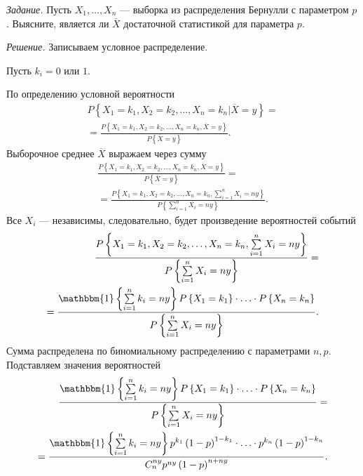 \textit{Задание.} Пусть $X_1, \dotsc, X_n$ --- выборка из распределения Бернулли с параметром $p$.
Выясните, является ли $ \overline{X}$ достаточной статистикой для параметра $p$.

\textit{Решение.} Записываем условное распределение.

Пусть $k_i = 0$ или $1$.

По определению условной вероятности
\begin{equation*}
  \begin{split}
    P \left\{ \left. X_1 = k_1, X_2 = k_2, \dotsc, X_n = k_n \right| \overline{X} = y \right\} = \\
    = \frac{P \left\{ X_1 = k_1, X_2 = k_2, \dotsc, X_n = k_n, \overline{X} = y \right\} }{P \left\{ \overline{X} = y \right\} }.
  \end{split}
\end{equation*}
Выборочное среднее $ \overline{X}$ выражаем через сумму
\begin{equation*}
  \begin{split}
    \frac{P \left\{ X_1 = k_1, X_2 = k_2, \dotsc, X_n = k_n, \overline{X} = y \right\} }{P \left\{ \overline{X} = y \right\} } = \\
    = \frac{P \left\{ X_1 = k_1, X_2 = k_2, \dotsc, X_n = k_n, \sum \limits_{i = 1}^n X_i = ny \right\} }{P \left\{ \sum \limits_{i = 1}^n X_i = ny \right\} }.
  \end{split}
\end{equation*}
Все $X_i$ --- независимы, следовательно, будет произведение вероятностей событий
\begin{equation*}
  \begin{split}
    \frac{P \left\{ X_1 = k_1, X_2 = k_2, \dotsc, X_n = k_n, \sum \limits_{i = 1}^n X_i = ny \right\} }{P \left\{ \sum \limits_{i = 1}^n X_i = ny \right\} } = \\
    = \frac{ \mathbbm{1} \left\{ \sum \limits_{i = 1}^n k_i = ny \right\} P \left\{ X_1 = k_1 \right\} \cdot \dotsc \cdot P \left\{ X_n = k_n \right\} }{P \left\{ \sum \limits_{i = 1}^n X_i = ny \right\} }.
  \end{split}
\end{equation*}
Сумма распределена по биномиальному распределению с параметрами $n, p$.
Подставляем значения вероятностей
\begin{equation*}
  \begin{split}
    \frac{ \mathbbm{1} \left\{ \sum \limits_{i = 1}^n k_i = ny \right\} P \left\{ X_1 = k_1 \right\} \cdot \dotsc \cdot P \left\{ X_n = k_n \right\} }{P \left\{ \sum \limits_{i = 1}^n X_i = ny \right\} } = \\
    = \frac{ \mathbbm{1} \left\{ \sum \limits_{i = 1}^n k_i = ny \right\} p^{k_1} \left( 1 - p \right)^{1 - k_1} \cdot \dotsc \cdot p^{k_n} \left( 1 - p \right)^{1 - k_n}}{C_n^{ny} p^{ny} \left( 1 - p \right)^{n + ny}}.
  \end{split}
\end{equation*}
